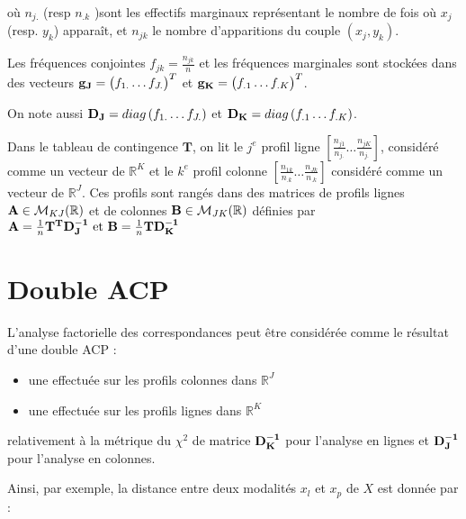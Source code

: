 \documentclass[letterpaper,10pt,english]{jupyterBook}
\begin{document}
\sphinxAtStartPar
où \(n_{j.}\) (resp \(n_{.k}\) )sont les effectifs marginaux représentant le nombre de fois où \(x_j\) (resp. \(y_k\)) apparaît, et \(n_{jk}\) le nombre d’apparitions du couple \((x_j,y_k)\).

\sphinxAtStartPar
Les fréquences conjointes \(f_{jk}=\frac{n_{jk}}{n}\) et les fréquences marginales sont stockées dans des vecteurs \({\bf g_J}=\begin{pmatrix}f_{1.}\ldots f_{J.} \end{pmatrix}^T\) et \({\bf g_K}=\begin{pmatrix}f_{.1}\ldots f_{.K} \end{pmatrix}^T\).

\sphinxAtStartPar
On note aussi \({\bf D_J}=diag\left (f_{1.}\ldots f_{J.}\right )\) et \({\bf D_K}=diag\left (f_{.1}\ldots f_{.K} \right )\).

\sphinxAtStartPar
Dans le tableau de contingence \(\mathbf T\), on lit le \(j^e\) profil ligne \([\frac{n_{j1}}{n_{j.}}\ldots \frac{n_{jK}}{n_{j.}}]\), considéré comme un vecteur de \(\mathbb{R}^K\) et le \(k^e\) profil colonne \([\frac{n_{1k}}{n_{.k}}\ldots \frac{n_{Jk}}{n_{.k}}]\) considéré comme un vecteur de \(\mathbb{R}^J\). Ces profils sont rangés dans des matrices de profils lignes \({\bf A}\in\mathcal{M}_{KJ}(\mathbb{R})\) et de colonnes \({\bf B}\in\mathcal{M}_{JK}(\mathbb{R})\) définies par \({\bf A}=\frac{1}{n}{\bf T^TD_J^{-1}}\textrm{  et  } {\bf B}=\frac{1}{n}{\bf T D_K^{-1}}\)


\section{Double ACP}
\label{\detokenize{afc:double-acp}}
\sphinxAtStartPar
L’analyse factorielle des correspondances peut être considérée comme le résultat d’une double ACP :
\begin{itemize}
\item {} 
\sphinxAtStartPar
une effectuée sur les profils colonnes dans \(\mathbb{R}^J\)

\item {} 
\sphinxAtStartPar
une effectuée sur les profils lignes dans \(\mathbb{R}^K\)

\end{itemize}

\sphinxAtStartPar
relativement à la métrique du \(\chi^2\) de matrice \({\bf D_K^{-1}}\) pour l’analyse en lignes et \({\bf D_J^{-1}}\) pour l’analyse en colonnes.

\sphinxAtStartPar
Ainsi, par exemple, la distance entre deux modalités \(x_l\) et \(x_p\) de \(X\) est donnée par :
\end{document}
